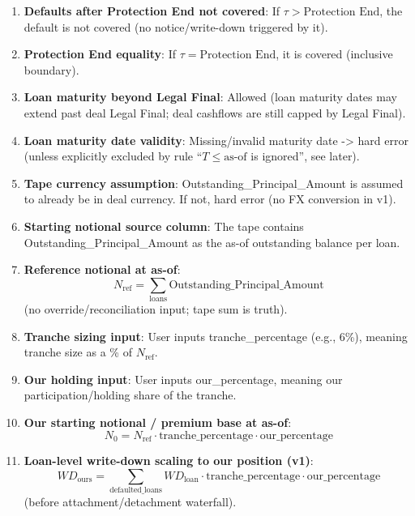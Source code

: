 \documentclass[11pt]{article}
\begin{document}
\begin{enumerate}[label=\arabic*),leftmargin=*,align=left]
\item \textbf{Defaults after Protection End not covered}: If $\tau > \text{Protection End}$, the default is not covered (no notice/write-down triggered by it).

\item \textbf{Protection End equality}: If $\tau = \text{Protection End}$, it is covered (inclusive boundary).

\item \textbf{Loan maturity beyond Legal Final}: Allowed (loan maturity dates may extend past deal Legal Final; deal cashflows are still capped by Legal Final).

\item \textbf{Loan maturity date validity}: Missing/invalid maturity date -> hard error (unless explicitly excluded by rule “$T \le \text{as-of}$ is ignored”, see later).

\item \textbf{Tape currency assumption}: Outstanding\_Principal\_Amount is assumed to already be in deal currency. If not, hard error (no FX conversion in v1).

\item \textbf{Starting notional source column}: The tape contains Outstanding\_Principal\_Amount as the as-of outstanding balance per loan.

\item \textbf{Reference notional at as-of}: 
\[ N_{\text{ref}} = \sum_{\text{loans}} \text{Outstanding\_Principal\_Amount} \]
(no override/reconciliation input; tape sum is truth).

\item \textbf{Tranche sizing input}: User inputs tranche\_percentage (e.g., 6\%), meaning tranche size as a \% of $N_{\text{ref}}$.

\item \textbf{Our holding input}: User inputs our\_percentage, meaning our participation/holding share of the tranche.

\item \textbf{Our starting notional / premium base at as-of}: 
\[ N_0 = N_{\text{ref}} \cdot \text{tranche\_percentage} \cdot \text{our\_percentage} \]

\item \textbf{Loan-level write-down scaling to our position (v1)}: 
\[ WD_{\text{ours}} = \sum_{\text{defaulted\_loans}} WD_{\text{loan}} \cdot \text{tranche\_percentage} \cdot \text{our\_percentage} \]
(before attachment/detachment waterfall).


\end{enumerate}
\end{document}
